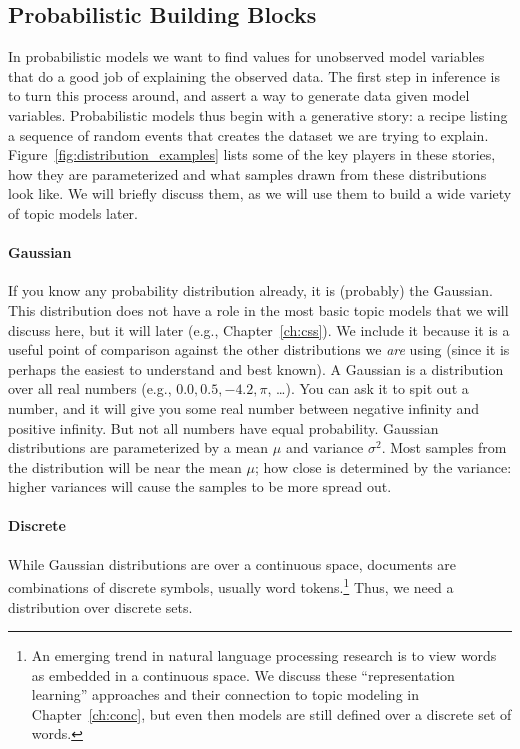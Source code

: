 \subsection{Probabilistic Building Blocks}
\label{sec:intro_building_blocks}

In probabilistic models we want to find values for unobserved model variables that do a good job of explaining the observed data.
The first step in inference is to turn this process around, and assert a way to generate data given model variables.
Probabilistic models thus begin with a generative story: a recipe listing a sequence of random events
that creates the dataset we are trying to explain.
Figure~\ref{fig:distribution_examples} lists some of the key players in these
stories, how they are parameterized and what samples drawn from these distributions look like.  We will
briefly discuss them, as we will use them to build a wide variety of topic models later.

\paragraph{Gaussian} If you know any probability distribution already,
it is (probably) the
Gaussian.  This distribution does not have a role in the most basic topic models that we will
discuss here, but it will later (e.g., Chapter~\ref{ch:css}).  We
include it because it is a useful point of comparison against the other
distributions we {\em are} using (since it is perhaps the easiest to understand and best
known). A Gaussian is a distribution over all real numbers (e.g., $0.0, 0.5,
-4.2, \pi$, \dots).  You can ask it to spit out a number, and it will give you
some real number between negative infinity and positive infinity.  But not all
numbers have equal probability.  Gaussian distributions are parameterized by a
mean $\mu$ and variance $\sigma^2$.  Most samples from the distribution will be
near the mean $\mu$; how close is determined by the variance: higher variances
will cause the samples to be more spread out.

\paragraph{Discrete}

While Gaussian distributions are over a continuous space, documents are
combinations of discrete symbols, usually word tokens.\footnote{An emerging trend in natural language
  processing research is to view words as embedded in a continuous space. We
  discuss these ``representation learning'' approaches and their connection to
  topic modeling in Chapter~\ref{ch:conc}, but even then models are still defined over a discrete set of words.}   Thus, we need a distribution
over discrete sets.

